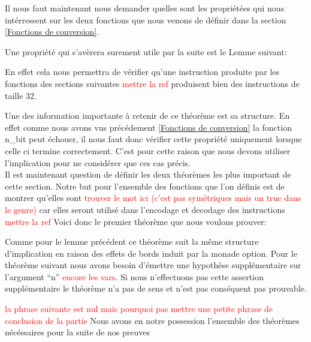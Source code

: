 \documentclass {article}
\newcommand{\codefrom}[3]
           {}
\theoremstyle{definition}
\theoremstyle{remark}
\newcommand{\todo}[1]{\textcolor{red}{#1}}
\begin{document}
Il nous faut maintenant nous demander quelles sont les propriétées qui nous intérressent sur
les deux fonctions que nous venons de définir dans la section \ref{Fonctions de conversion}.

Une propriété qui s'avèrera surement utile par la suite est le Lemme suivant:

En effet cela nous permettra de vérifier qu'une instruction produite par les fonctions
des sections suivantes \todo{mettre la ref} produisent bien des instructions de taille 32.

\codefrom{src}{binary}{size_n_bit}

Une des information importante à retenir de ce théorème est sa structure.
En effet comme nous avons vus précédement \ref{Fonctions de conversion} la
fonction n_bit peut échouer, il nous faut donc vérifier cette propriété
uniquement lorsque celle ci termine correctement. C'est pour cette raison
que nous devons utiliser l'implication pour ne considérer que ces cas précis. \\

Il est maintenant question de définir les deux théorèmes les plus important de
cette section. Notre but pour l'ensemble des fonctions que l'on définis est de
montrer qu'elles sont \todo{trouver le mot ici (c'est pas symétriques mais un truc dans le genre)}
car elles seront utilisé dans l'encodage et decodage des instructions \todo{mettre la ref}
Voici donc le premier théorème que nous voulons prouver:

\codefrom{src}{binary}{nbitn}

Comme pour le lemme précédent ce théorème suit la même structure d'implication en raison des effets
de bords induit par la monade option.
Pour le théorème suivant nous avons besoin d'émettre une hypothèse supplémentaire sur l'argument
``n'' \todo{encore les vars}. Si nous n'effectuons pas cette assertion supplémentaire le
théorème n'a pas de sens et n'est pas conséquent pas prouvable.

\codefrom{src}{binary}{bitnbit}

\todo{la phrase suivante est nul mais pourquoi pas mettre une petite phrase de conclusion de la partie}
Nous avons en notre possession l'ensemble des théorèmes nécéssaires pour la suite de nos preuves
\end{document}

